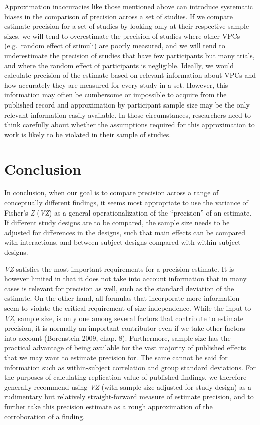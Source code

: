 \documentclass[]{article}
\begin{document}
Approximation inaccuracies like those mentioned above can introduce
systematic biases in the comparison of precision across a set of
studies. If we compare estimate precision for a set of studies by
looking only at their respective sample sizes, we will tend to
overestimate the precision of studies where other VPCs (e.g.~random
effect of stimuli) are poorly measured, and we will tend to
underestimate the precision of studies that have few participants but
many trials, and where the random effect of participants is negligible.
Ideally, we would calculate precision of the estimate based on relevant
information about VPCs and how accurately they are measured for every
study in a set. However, this information may often be cumbersome or
impossible to acquire from the published record and approximation by
participant sample size may be the only relevant information easily
available. In those circumstances, researchers need to think carefully
about whether the assumptions required for this approximation to work is
likely to be violated in their sample of studies.

\hypertarget{conclusion}{%
\section{Conclusion}\label{conclusion}}

In conclusion, when our goal is to compare precision across a range of
conceptually different findings, it seems most appropriate to use the
variance of Fisher's \emph{Z} (\emph{VZ}) as a general
operationalization of the ``precision'' of an estimate. If different
study designs are to be compared, the sample size needs to be adjusted
for differences in the designs, such that main effects can be compared
with interactions, and between-subject designs compared with
within-subject designs.

\emph{VZ} satisfies the most important requirements for a precision
estimate. It is however limited in that it does not take into account
information that in many cases is relevant for precision as well, such
as the standard deviation of the estimate. On the other hand, all
formulas that incorporate more information seem to violate the critical
requirement of size independence. While the input to \emph{VZ}, sample
size, is only one among several factors that contribute to estimate
precision, it is normally an important contributor even if we take other
factors into account (Borenstein 2009, chap. 8). Furthermore, sample
size has the practical advantage of being available for the vast
majority of published effects that we may want to estimate precision
for. The same cannot be said for information such as within-subject
correlation and group standard deviations. For the purposes of
calculating replication value of published findings, we therefore
generally recommend using \emph{VZ} (with sample size adjusted for study
design) as a rudimentary but relatively straight-forward measure of
estimate precision, and to further take this precision estimate as a
rough approximation of the corroboration of a finding.
\end{document}
